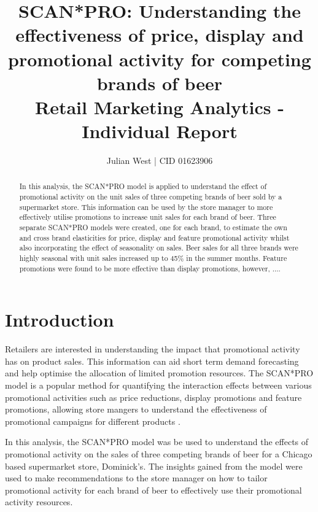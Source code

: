 \documentclass[a4paper,11pt]{article}
\title{SCAN*PRO: Understanding the effectiveness of price, display and promotional activity for competing brands of beer  \\
\addlinespace
\large Retail Marketing Analytics - Individual Report}
\author{Julian West | CID 01623906}
\begin{document}
\maketitle
\begin{abstract}
In this analysis, the SCAN*PRO model is applied to understand the effect of promotional activity on the unit sales of three competing brands of beer sold by a supermarket store. This information can be used by the store manager to more effectively utilise promotions to increase unit sales for each brand of beer. Three separate SCAN*PRO models were created, one for each brand, to estimate the own and cross brand elasticities for price, display and feature promotional activity whilst also incorporating the effect of seasonality on sales. Beer sales for all three brands were highly seasonal with unit sales increased up to 45\% in the summer months. Feature promotions were found to be more effective than display promotions, however, ....

\end{abstract} \hspace{50pt}

\newpage
\tableofcontents
\newpage

\section{Introduction}
Retailers are interested in understanding the impact that promotional activity has on product sales. This information can aid short term demand forecasting and help optimise the allocation of limited promotion resources. The SCAN*PRO model \citep{wittink_estimation_1988} is a popular method for quantifying the interaction effects between various promotional activities such as price reductions, display promotions and feature promotions, allowing store mangers to understand the effectiveness of promotional campaigns for different products \citep{andrews_estimating_2008, srinivasan_promotions_2004}. 

In this analysis, the SCAN*PRO model was be used to understand the effects of promotional activity on the sales of three competing brands of beer for a Chicago based supermarket store, Dominick's. The insights gained from the model were used to make recommendations to the store manager on how to tailor promotional activity for each brand of beer to effectively use their promotional activity resources.
\end{document}
